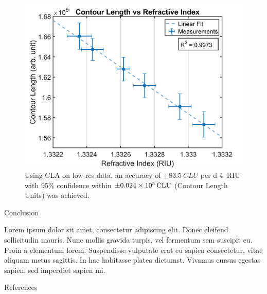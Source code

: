 \documentclass[final]{beamer}
\newlength{\onecolwid}
\begin{document}
\begin{frame}[t]
\begin{columns}[t]
\begin{column}{\onecolwid}
\begin{figure}
\includegraphics[width=1\linewidth]{Images/contour_len_ref_index_v2_HD_v2_LQ.png}
\caption{Using CLA on low-res data, an accuracy of $\pm\SI{83.5}{CLU}$ per \SI{d-4}{RIU} with 95\% confidence within $\pm\SI{0.024d5}{CLU}$ (Contour Length Units) was achieved.}
\end{figure}
\vspace{-0.3in}


\begin{alertblock}{Conclusion}

Lorem ipsum dolor sit amet, consectetur adipiscing elit. Donec eleifend sollicitudin mauris. Nunc mollis gravida turpis, vel fermentum sem suscipit eu. Proin a elementum lorem. Suspendisse vulputate erat eu sapien consectetur, vitae aliquam metus sagittis. In hac habitasse platea dictumst. Vivamus cursus egestas sapien, sed imperdiet sapien mi.

\end{alertblock}
\vspace{-0.3in}


\begin{block}{References}

\nocite{*} %
\small{
\vspace{0.75in}}

\end{block}


\end{column} %

\end{columns} %

\end{frame} %
\end{document}
